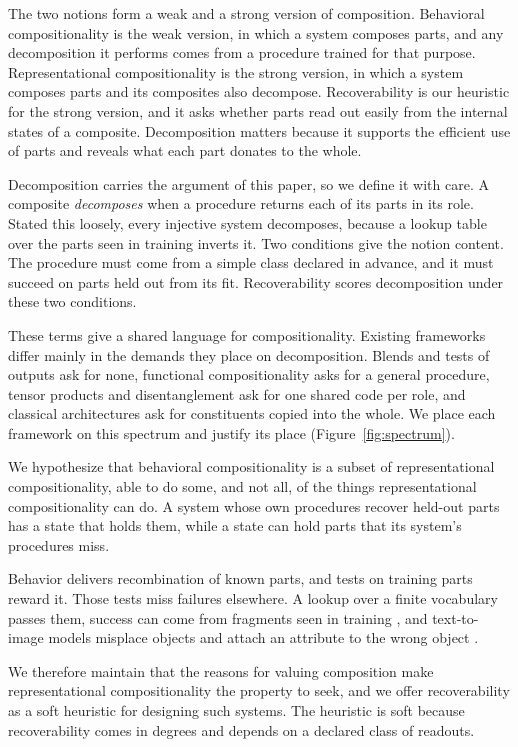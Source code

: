 \documentclass[10pt]{article}
\theoremstyle{plain}
\theoremstyle{remark}
\begin{document}
The two notions form a weak and a strong version of composition. Behavioral compositionality is the weak version, in which a system composes parts, and any decomposition it performs comes from a procedure trained for that purpose. Representational compositionality is the strong version, in which a system composes parts and its composites also decompose. Recoverability is our heuristic for the strong version, and it asks whether parts read out easily from the internal states of a composite. Decomposition matters because it supports the efficient use of parts and reveals what each part donates to the whole.

Decomposition carries the argument of this paper, so we define it with care. A composite \emph{decomposes} when a procedure returns each of its parts in its role. Stated this loosely, every injective system decomposes, because a lookup table over the parts seen in training inverts it. Two conditions give the notion content. The procedure must come from a simple class declared in advance, and it must succeed on parts held out from its fit. Recoverability scores decomposition under these two conditions.

These terms give a shared language for compositionality. Existing frameworks differ mainly in the demands they place on decomposition. Blends and tests of outputs ask for none, functional compositionality asks for a general procedure, tensor products and disentanglement ask for one shared code per role, and classical architectures ask for constituents copied into the whole. We place each framework on this spectrum and justify its place (Figure~\ref{fig:spectrum}).

We hypothesize that behavioral compositionality is a subset of representational compositionality, able to do some, and not all, of the things representational compositionality can do. A system whose own procedures recover held-out parts has a state that holds them, while a state can hold parts that its system's procedures miss.

Behavior delivers recombination of known parts, and tests on training parts reward it. Those tests miss failures elsewhere. A lookup over a finite vocabulary passes them, success can come from fragments seen in training \citep{dziri2023}, and text-to-image models misplace objects \citep{conwell2022} and attach an attribute to the wrong object \citep{rassin2022}.

We therefore maintain that the reasons for valuing composition make representational compositionality the property to seek, and we offer recoverability as a soft heuristic for designing such systems. The heuristic is soft because recoverability comes in degrees and depends on a declared class of readouts.
\end{document}

